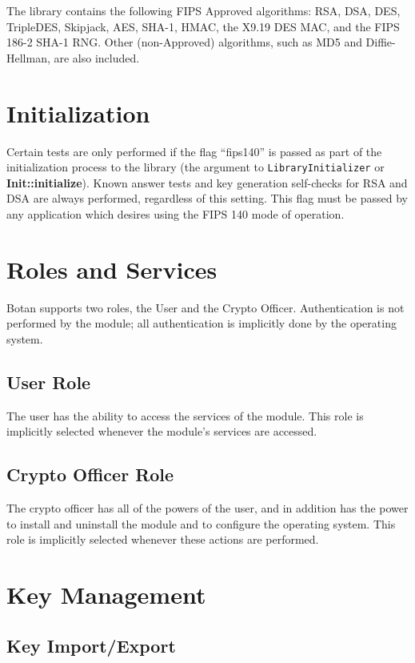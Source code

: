 \documentclass{article}
\newcommand{\type}[1]{\texttt{#1}}
\newcommand{\function}[1]{\textbf{#1}}
\begin{document}
The library contains the following FIPS Approved algorithms: RSA, DSA, DES,
TripleDES, Skipjack, AES, SHA-1, HMAC, the X9.19 DES MAC, and the FIPS 186-2
SHA-1 RNG. Other (non-Approved) algorithms, such as MD5 and Diffie-Hellman, are
also included.

\section{Initialization}

Certain tests are only performed if the flag ``fips140'' is passed as part of
the initialization process to the library (the argument to
\type{LibraryInitializer} or \function{Init::initialize}). Known answer tests
and key generation self-checks for RSA and DSA are always performed, regardless
of this setting. This flag must be passed by any application which desires
using the FIPS 140 mode of operation.

\section{Roles and Services}

Botan supports two roles, the User and the Crypto Officer. Authentication is
not performed by the module; all authentication is implicitly done by the
operating system.

\subsection{User Role}

The user has the ability to access the services of the module. This role is
implicitly selected whenever the module's services are accessed.

\subsection{Crypto Officer Role}

The crypto officer has all of the powers of the user, and in addition has the
power to install and uninstall the module and to configure the operating
system. This role is implicitly selected whenever these actions are performed.

\section{Key Management}

\subsection{Key Import/Export}
\end{document}
